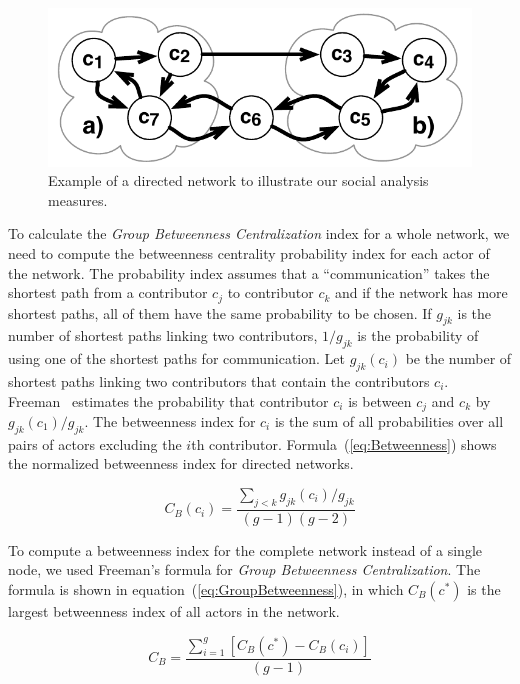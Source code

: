 \begin{figure}[t]
\begin{center}
\includegraphics[width=.4\columnwidth]{figures/CentralityExample}
\caption{Example of a directed network to illustrate our social
analysis measures.}
\label{fig:CentralityExample}
\end{center}
\end{figure}

To calculate the \emph{Group Betweenness Centralization} index for a whole
network, we need to compute the betweenness centrality probability index for each
actor of the network. The probability index assumes that a ``communication''
takes the shortest path from a contributor $c_j$ to contributor $c_k$ and if the
network has more shortest paths, all of them have the same probability to be
chosen. If $g_{jk}$ is the number of shortest paths linking two contributors,
$1/g_{jk}$ is the probability of using one of the shortest paths for
communication. Let $g_{jk}(c_i)$ be the number of shortest paths linking two
contributors that contain the contributors $c_i$. Freeman~\cite{Freeman:1979rl}
estimates the probability that contributor $c_i$ is between $c_j$ and $c_k$ by
$g_{jk}(c_1)/g_{jk}$. The betweenness index for $c_i$ is the sum of all
probabilities over all pairs of actors excluding the $i$th contributor.
Formula~(\ref{eq:Betweenness}) shows the normalized betweenness index for
directed networks.

\begin{equation}
\displaystyle C_B(c_i) =  \frac{\sum_{j<k} g_{jk}(c_i)/g_{jk}}{(g-1)(g-2)}
\label{eq:Betweenness}
\end{equation}

To compute a betweenness index for the complete network instead of a single node,
we used Freeman's formula for \emph{Group Betweenness Centralization}. The
formula is shown in equation~(\ref{eq:GroupBetweenness}), in which $C_B(c^*)$ is
the largest betweenness index of all actors in the network.

\begin{equation}
\displaystyle C_B =  \frac{\sum_{i=1}^g[C_B(c^*)-C_B(c_i)]}{(g-1)}
\label{eq:GroupBetweenness}
\end{equation}


